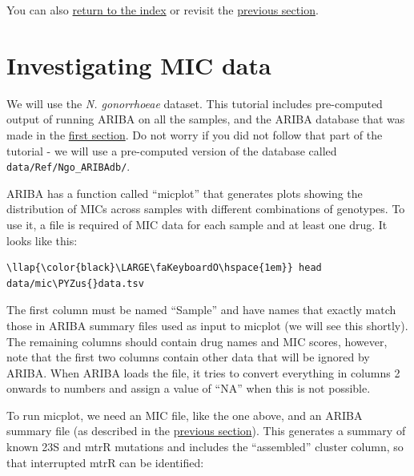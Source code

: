 \documentclass[11pt]{article}
\def\PYZus{\char`\_}
\begin{document}
You can also \href{index.ipynb}{return to the index} or revisit the
\href{phandango.ipynb}{previous section}.





\newpage





    \hypertarget{investigating-mic-data}{%
\section{Investigating MIC data}\label{investigating-mic-data}}

We will use the \textit{N. gonorrhoeae} dataset. This tutorial includes
pre-computed output of running ARIBA on all the samples, and the ARIBA
database that was made in the \href{make_custom_db.ipynb}{first
section}. Do not worry if you did not follow that part of the tutorial -
we will use a pre-computed version of the database called
\texttt{data/Ref/Ngo\_ARIBAdb/}.

ARIBA has a function called ``micplot'' that generates plots showing the
distribution of MICs across samples with different combinations of
genotypes. To use it, a file is required of MIC data for each sample and
at least one drug. It looks like this:

\begin{terminalinput}
\begin{Verbatim}[commandchars=\\\{\}]
\llap{\color{black}\LARGE\faKeyboardO\hspace{1em}} head data/mic\PYZus{}data.tsv
\end{Verbatim}
\end{terminalinput}

    The first column must be named ``Sample'' and have names that exactly
match those in ARIBA summary files used as input to micplot (we will see
this shortly). The remaining columns should contain drug names and MIC
scores, however, note that the first two columns contain other data that
will be ignored by ARIBA. When ARIBA loads the file, it tries to convert
everything in columns 2 onwards to numbers and assign a value of ``NA''
when this is not possible.

To run micplot, we need an MIC file, like the one above, and an ARIBA
summary file (as described in the \href{phandango.ipynb}{previous
section}). This generates a summary of known 23S and mtrR mutations and
includes the ``assembled'' cluster column, so that interrupted mtrR can
be identified:
\end{document}
